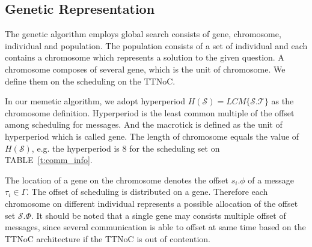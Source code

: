 \documentclass[journal]{IEEEtran}
\newcommand{\calS}{\mathcal{S}}
\newcommand{\calT}{\mathcal{T}}
\theoremstyle{remark}
\begin{document}
\subsection{Genetic Representation}

The genetic algorithm employs global search consists of gene, chromosome,
 individual and population. 
The population consists of a set of individual and each contains a chromosome which represents a solution to the given question. 
A chromosome composes of several gene,
 which is the unit of chromosome.
We define them on the scheduling on the TTNoC.

In our memetic algorithm,
 we adopt hyperperiod  $H(\calS) = LCM\{\calS.\calT\}$
 as the chromosome definition.
Hyperperiod is the least common multiple of the offset among scheduling for messages. 
And the macrotick is defined as the unit of hyperperiod which is called gene.
The length of chromosome equals the value of $H(\calS)$,
 e.g. the hyperperiod is 8 for the scheduling set on TABLE~\ref{t:comm_info}. 

The location of a gene on the chromosome denotes the offset $ s_i.\phi $ of a message $\tau_i\in\Gamma$.
The offset of scheduling is distributed on a gene.
Therefore each chromosome on different individual represents a possible allocation of the offset set $\calS.\Phi$.
It should be noted that a single gene may consists multiple offset of messages,
 since several communication is able to offset at same time based on the TTNoC architecture if the TTNoC is out of contention.
\end{document}
